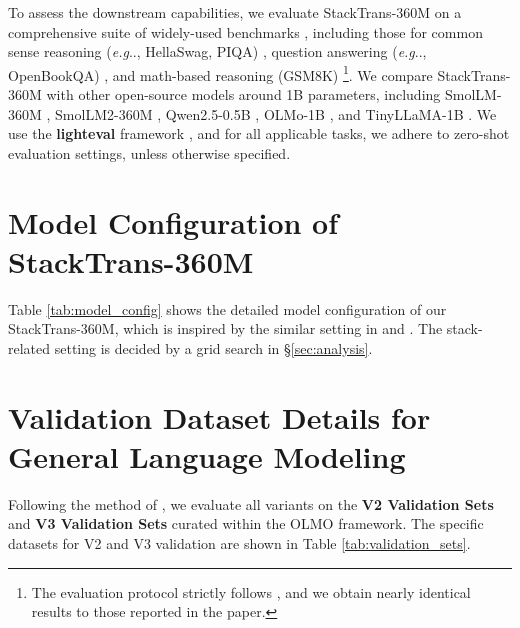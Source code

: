 \documentclass{article}
\makeatletter
\DeclareRobustCommand\onedot{\futurelet\@let@token\@onedot}
\def\@onedot{\ifx\@let@token.\else.\null\fi\xspace}
\def\eg{\emph{e.g}\onedot} \def\Eg{\emph{E.g}\onedot}
\DeclareRobustCommand{\method}{{\sc StackTrans}\xspace}
\DeclareRobustCommand{\textbfmethod}{{\sc \textbf{StackTrans}}\xspace}
\makeatother
\begin{document}
To assess the downstream capabilities, we evaluate \method-360M on a comprehensive suite of widely-used benchmarks \citep{brown2020language, touvron2023llama, groeneveld2024olmo}, including those for common sense reasoning (\eg, HellaSwag, PIQA) \citep{HellaSwag, arc, mmlu, piqa, WinoGrande}, question answering (\eg, OpenBookQA) \citep{CommonsenseQA, TriviaQA, OpenbookQA}, and math-based reasoning (GSM8K) \citep{gsm8k} \footnote{The evaluation protocol strictly follows \cite{allal2025smollm2}, and we obtain nearly identical results to those reported in the paper.}.
We compare \method-360M with other open-source models around 1B parameters, including SmolLM-360M \citep{allal2024SmolLM}, SmolLM2-360M \citep{allal2025smollm2}, Qwen2.5-0.5B \citep{yang2024qwen2}, OLMo-1B \citep{groeneveld2024olmo}, and TinyLLaMA-1B \citep{zhang2024tinyllama}. 
We use the \textbf{lighteval} framework \citep{lightevalcode}, and for all applicable tasks, we adhere to zero-shot evaluation settings, unless otherwise specified.

\section{Model Configuration of \textbfmethod-360M}
\label{appendix:modelconfig}

Table \ref{tab:model_config} shows the detailed model configuration of our \method-360M, which is inspired by the similar setting in \cite{allal2024SmolLM} and \cite{allal2025smollm2}. The stack-related setting is decided by a grid search in \S\ref{sec:analysis}.


\section{Validation Dataset Details for General Language Modeling}
\label{appendix:validation_sets}

Following the method of \cite{hyperconnect}, we evaluate all variants on the \textbf{V2 Validation Sets} and \textbf{V3 Validation Sets} curated within the OLMO framework. 
The specific datasets for V2 and V3 validation \citep{hyperconnect} are shown in Table \ref{tab:validation_sets}.



\newpage
\clearpage
\end{document}
